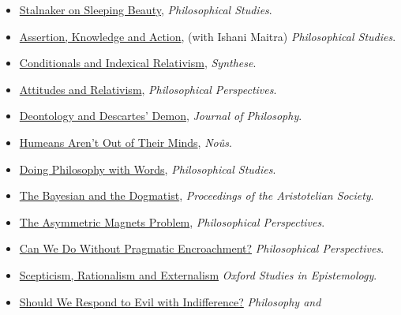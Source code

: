 \documentclass[
  10pt,
  letterpaper,
  DIV=11,
  numbers=noendperiod,
  twoside]{scrartcl}
\begin{document}
\begin{itemize}
{  Royal Road to Relativism}, \emph{Analysis}.
\item
  \href{https://brian.weatherson.org/quarto/posts/stalnaker-sleeping-beauity/stalnaker-on-sleeping-beauty.html}{Stalnaker
  on Sleeping Beauty}, \emph{Philosophical Studies}.
\item
  \href{https://brian.weatherson.org/quarto/posts/aka/assertion-knowledge-and-action.html}{Assertion,
  Knowledge and Action}, (with Ishani Maitra) \emph{Philosophical
  Studies}.
\item
  \href{https://brian.weatherson.org/quarto/posts/cair/conditionals-and-indexical-relativism.html}{Conditionals
  and Indexical Relativism}, \emph{Synthese}.
\item
  \href{https://brian.weatherson.org/quarto/posts/relative-attitude/attitudes-and-relativism.html}{Attitudes
  and Relativism}, \emph{Philosophical Perspectives}.
\item
  \href{https://brian.weatherson.org/quarto/posts/ddd/deontology-and-descartess-demon.html}{Deontology
  and Descartes' Demon}, \emph{Journal of Philosophy}.
\item
  \href{https://brian.weatherson.org/quarto/posts/haootm/humeans-arent-out-of-their-minds.html}{Humeans
  Aren't Out of Their Minds}, \emph{Noûs}.
\item
  \href{https://brian.weatherson.org/quarto/posts/dpww/doing-philosophy-with-words.html}{Doing
  Philosophy with Words}, \emph{Philosophical Studies}.
\item
  \href{https://brian.weatherson.org/quarto/posts/bayesdog/the-bayesian-and-the-dogmatist.html}{The
  Bayesian and the Dogmatist}, \emph{Proceedings of the Aristotelian
  Society}.
\item
  \href{https://brian.weatherson.org/quarto/posts/tamp/the-asymmetric-magnets-problem.html}{The
  Asymmetric Magnets Problem}, \emph{Philosophical Perspectives}.
\item
  \href{https://brian.weatherson.org/quarto/posts/cwpwpe/can-we-do-without-pragmatic-encroachment.html}{Can
  We Do Without Pragmatic Encroachment?} \emph{Philosophical
  Perspectives}.
\item
  \href{https://brian.weatherson.org/quarto/posts/sre/scepticism-rationalism-and-externalism.html}{Scepticism,
  Rationalism and Externalism} \emph{Oxford Studies in Epistemology}.
\item
  \href{https://brian.weatherson.org/quarto/posts/evil/should-we-respond-to-evil-with-indifference.html}{Should
  We Respond to Evil with Indifference?} \emph{Philosophy and
}
\end{itemize}
\end{document}
